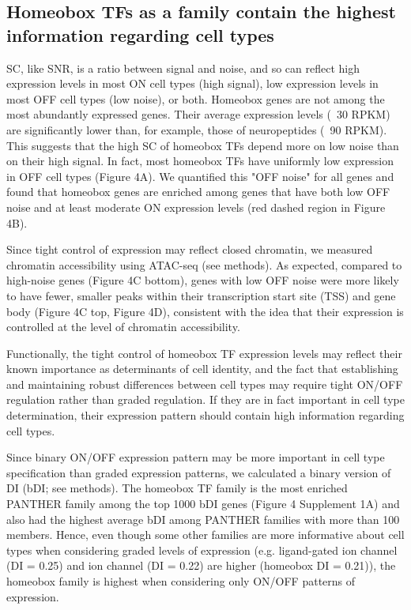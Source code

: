 \subsection{Homeobox TFs as a family contain the highest information regarding cell types}

SC, like SNR, is a ratio between signal and noise, and so can reflect high expression levels in most ON cell types (high signal), low expression levels in most OFF cell types (low noise), or both. Homeobox genes are not among the most abundantly expressed genes. Their average expression levels (~30 RPKM) are significantly lower than, for example, those of neuropeptides (~90 RPKM). This suggests that the high SC of homeobox TFs depend more on low noise than on their high signal. In fact, most  homeobox TFs have uniformly low expression in OFF cell types (Figure 4A). We quantified this "OFF noise" for all genes and found that homeobox genes are enriched among genes that have both low OFF noise and at least moderate ON expression levels (red dashed region in Figure 4B).

Since tight control of expression may reflect closed chromatin, we measured chromatin accessibility using ATAC-seq (see methods). As expected, compared to high-noise genes (Figure 4C bottom), genes with low OFF noise were more likely to have fewer, smaller peaks within their transcription start site (TSS) and gene body (Figure 4C top, Figure 4D), consistent with the idea that their expression is controlled at the level of chromatin accessibility.

Functionally, the tight control of homeobox TF expression levels may reflect their known importance as determinants of cell identity, and the fact that establishing and maintaining robust differences between cell types may require tight ON/OFF regulation rather than graded regulation. If they are in fact important in cell type determination, their expression pattern should contain high information regarding cell types. 

Since binary ON/OFF expression pattern may be more important in cell type specification than graded expression patterns, we calculated a binary version of DI (bDI; see methods). The homeobox TF family is the most enriched PANTHER family among the top 1000 bDI genes (Figure 4 Supplement 1A) and also had the highest average bDI among PANTHER families with more than 100 members. Hence, even though some other families are more informative about cell types when considering graded levels of expression (e.g. ligand-gated ion channel (DI = 0.25) and ion channel (DI = 0.22) are higher (homeobox DI = 0.21)), the homeobox family is highest when considering only ON/OFF patterns of expression.  

